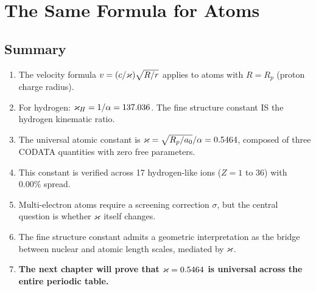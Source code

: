 
\chapter{The Same Formula for Atoms}
\label{ch:same-formula-atoms}

\section{Summary}
\label{sec:ch2-summary}

\begin{enumerate}
  \item The velocity formula $v = (c/\varkappa)\sqrt{R/r}$ applies to atoms with $R = R_p$ (proton charge radius).
  \item For hydrogen: $\varkappa_H = 1/\alpha = 137.036$.  The fine structure constant IS the hydrogen kinematic ratio.
  \item The universal atomic constant is $\varkappa = \sqrt{R_p/a_0}/\alpha = 0.5464$, composed of three CODATA quantities with zero free parameters.
  \item This constant is verified across 17 hydrogen-like ions ($Z = 1$ to $36$) with $0.00\%$ spread.
  \item Multi-electron atoms require a screening correction $\sigma$, but the central question is whether $\varkappa$ itself changes.
  \item The fine structure constant admits a geometric interpretation as the bridge between nuclear and atomic length scales, mediated by $\varkappa$.
  \item \textbf{The next chapter will prove that $\varkappa = 0.5464$ is universal across the entire periodic table.}
\end{enumerate}
